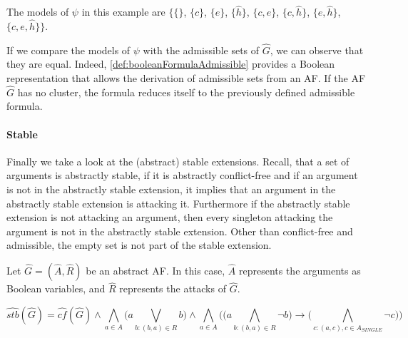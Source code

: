 \begin{example}
The models of $\psi$ in this example are $\big\{\{\}$, $\{c\}$, $\{e\}$, $\{\hat{h}\}$, $\{c, e\}$, $\{c, \hat{h}\}$, $\{e, \hat{h}\}$, $\{c, e, \hat{h}\} \big\}$.
\end{example}

If we compare the models of $\psi$ with the admissible sets of $\hat{G}$, we can observe that they are equal. Indeed, \cref{def:booleanFormulaAdmissible} provides a Boolean representation that allows the derivation of admissible sets from an AF. If the AF $\hat{G}$ has no cluster, the formula reduces itself to the previously defined admissible formula.



\paragraph{Stable} Finally we take a look at the (abstract) stable extensions. Recall, that a set of arguments is abstractly stable, if it is abstractly conflict-free and if an
argument is not in the abstractly stable extension, it implies that an argument in the
abstractly stable extension is attacking it. Furthermore if the abstractly stable extension
is not attacking an argument, then every singleton attacking the argument is not in the
abstractly stable extension. Other than conflict-free and admissible, the empty set is not part of the stable extension.

\begin{definition}
    Let $\hat{G}=(\hat{A},\hat{R})$ be an abstract AF. In this case, $\hat{A}$ represents the arguments as Boolean variables, and $\hat{R}$ represents the attacks of $\hat{G}$.
    \begin{center}
        \[ \hat{stb}(\hat{G})=
        \hat{cf}(\hat{G}) \land \bigwedge_{a \in A} \big( a \bigvee_{b:(b,a)\in R} b\big) \land \bigwedge_{a \in A} \big( \big(  a \bigwedge_{b:(b,a) \in R} \lnot b\big)  \rightarrow \big( \bigwedge_{c:(a,c), c \in A_{\!S\!I\!N\!G\!L\!E}} \lnot c\big) \big)
        \]
    \end{center}
    \label{def:booleanFormulaStable}
\end{definition}


